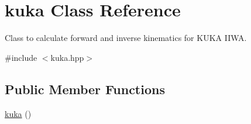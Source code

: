 \hypertarget{classkuka}{}\section{kuka Class Reference}
\label{classkuka}


Class to calculate forward and inverse kinematics for K\+U\+KA I\+I\+WA.  




{\ttfamily \#include $<$kuka.\+hpp$>$}

\subsection*{Public Member Functions}
\begin{DoxyCompactItemize}
\item 
\hyperlink{classkuka_af3a4e7638d63816706f342ddd9ca43e6}{kuka} ()\hypertarget{classkuka_af3a4e7638d63816706f342ddd9ca43e6}{}\label{classkuka_af3a4e7638d63816706f342ddd9ca43e6}


\end{DoxyCompactItemize}
